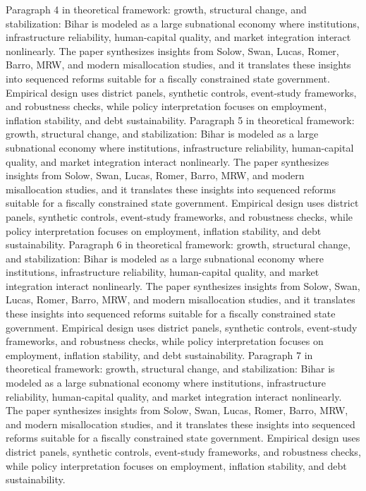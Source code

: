 \documentclass[preprint,12pt]{elsarticle}
\begin{document}
Paragraph 4 in theoretical framework: growth, structural change, and stabilization: Bihar is modeled as a large subnational economy where institutions, infrastructure reliability, human-capital quality, and market integration interact nonlinearly. The paper synthesizes insights from Solow, Swan, Lucas, Romer, Barro, MRW, and modern misallocation studies, and it translates these insights into sequenced reforms suitable for a fiscally constrained state government. Empirical design uses district panels, synthetic controls, event-study frameworks, and robustness checks, while policy interpretation focuses on employment, inflation stability, and debt sustainability.
Paragraph 5 in theoretical framework: growth, structural change, and stabilization: Bihar is modeled as a large subnational economy where institutions, infrastructure reliability, human-capital quality, and market integration interact nonlinearly. The paper synthesizes insights from Solow, Swan, Lucas, Romer, Barro, MRW, and modern misallocation studies, and it translates these insights into sequenced reforms suitable for a fiscally constrained state government. Empirical design uses district panels, synthetic controls, event-study frameworks, and robustness checks, while policy interpretation focuses on employment, inflation stability, and debt sustainability.
Paragraph 6 in theoretical framework: growth, structural change, and stabilization: Bihar is modeled as a large subnational economy where institutions, infrastructure reliability, human-capital quality, and market integration interact nonlinearly. The paper synthesizes insights from Solow, Swan, Lucas, Romer, Barro, MRW, and modern misallocation studies, and it translates these insights into sequenced reforms suitable for a fiscally constrained state government. Empirical design uses district panels, synthetic controls, event-study frameworks, and robustness checks, while policy interpretation focuses on employment, inflation stability, and debt sustainability.
Paragraph 7 in theoretical framework: growth, structural change, and stabilization: Bihar is modeled as a large subnational economy where institutions, infrastructure reliability, human-capital quality, and market integration interact nonlinearly. The paper synthesizes insights from Solow, Swan, Lucas, Romer, Barro, MRW, and modern misallocation studies, and it translates these insights into sequenced reforms suitable for a fiscally constrained state government. Empirical design uses district panels, synthetic controls, event-study frameworks, and robustness checks, while policy interpretation focuses on employment, inflation stability, and debt sustainability.
\end{document}
